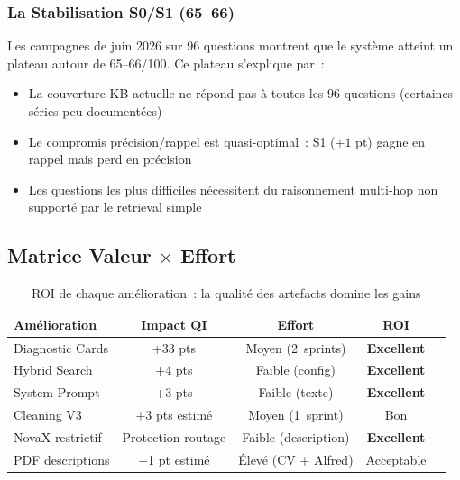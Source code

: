 \subsubsection{La Stabilisation S0/S1 (65--66)}

Les campagnes de juin 2026 sur 96 questions montrent que le système atteint un plateau autour de 65--66/100. Ce plateau s'explique par~:
\begin{itemize}
  \item La couverture KB actuelle ne répond pas à toutes les 96 questions (certaines séries peu documentées)
  \item Le compromis précision/rappel est quasi-optimal~: S1 ($+1$ pt) gagne en rappel mais perd en précision
  \item Les questions les plus difficiles nécessitent du raisonnement multi-hop non supporté par le retrieval simple
\end{itemize}

\subsection{Matrice Valeur $\times$ Effort}
\label{sec:matrice_roi}

\begin{table}[H]
\centering
\begin{tabular}{lcccl}
\toprule
\textbf{Amélioration} & \textbf{Impact QI} & \textbf{Effort} & \textbf{ROI} \\
\midrule
Diagnostic Cards & +33 pts & Moyen (2~sprints) & \textcolor{green!60!black}{\textbf{Excellent}} \\
Hybrid Search & +4 pts & Faible (config) & \textcolor{green!60!black}{\textbf{Excellent}} \\
System Prompt & +3 pts & Faible (texte) & \textcolor{green!60!black}{\textbf{Excellent}} \\
Cleaning V3 & +3 pts estimé & Moyen (1~sprint) & Bon \\
NovaX restrictif & Protection routage & Faible (description) & \textcolor{green!60!black}{\textbf{Excellent}} \\
PDF descriptions & +1 pt estimé & Élevé (CV + Alfred) & Acceptable \\
\bottomrule
\end{tabular}
\caption{ROI de chaque amélioration~: la qualité des artefacts domine les gains}
\label{tab:roi_pipeline}
\end{table}

